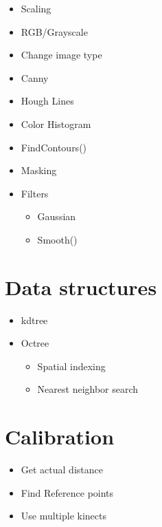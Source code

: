 \documentclass[11pt]{article}
\begin{document}
    \begin{itemize}
      
        \item Scaling
        \item RGB/Grayscale
        \item Change image type
        \item Canny
        \item Hough Lines
        \item Color Histogram
        \item FindContours()
        \item Masking

        \item Filters
          \begin{itemize}
            \item Gaussian
            \item Smooth()
          \end{itemize}
          
    \end{itemize}


\section*{Data structures}

    \begin{itemize}

          \item kdtree 
          \item Octree 
            \begin{itemize}
              \item Spatial indexing 
              \item Nearest neighbor search
            \end{itemize}

    \end{itemize}

\section*{Calibration}

    \begin{itemize}
      \item Get actual distance
      \item Find Reference points
      \item Use multiple kinects
    \end{itemize}
\end{document}
